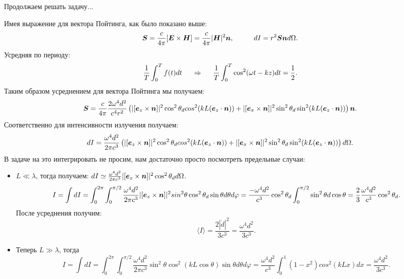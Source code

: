 Продолжаем решать задачу...

Имея выражение для вектора Пойтинга, как было показано выше:
\begin{equation*}
	\mbox{\boldmath $S$} = \frac{c}{4 \pi} [\mbox{\boldmath $E$} \times \mbox{\boldmath $H$}] = \frac{c}{4 \pi} |\mbox{\boldmath $H$}|^2 \mbox{\boldmath $n$},
	\hspace{1 cm}
	d I = r^2 \mbox{\boldmath $S$} \mbox{\boldmath $n$} d \Omega.
\end{equation*}
Усредняя по периоду: 
\begin{equation*}
	\frac{1}{T} \int_0^T f(t) d t
	\hspace{0.5 cm}
	 \Rightarrow
	 \hspace{0.5 cm}
	\frac{1}{T} \int_0^T \cos^2 (\omega t - kz) d t = \frac{1}{2}. 
\end{equation*}
Таким образом усреднением для вектора Пойтинга мы получаем:
\begin{equation*}
	\mbox{\boldmath $S$} = \frac{c}{4 \pi} \frac{2 \omega^4 d^2}{c^4 r^2} \left(
	|[\mbox{\boldmath $e$}_z \times \mbox{\boldmath $n$}]|^2 \cos^2 \theta_d cos^2 (k L (\mbox{\boldmath $e$}_z \cdot \mbox{\boldmath $n$}))
	+
	|[\mbox{\boldmath $e$}_x \times \mbox{\boldmath $n$}]|^2 \sin^2 \theta_d \sin^2 (k L (\mbox{\boldmath $e$}_z \cdot \mbox{\boldmath $n$}))
	\right) \mbox{\boldmath $n$}.
\end{equation*}
Соответственно для интенсивности излучения получаем:
\begin{equation*}
	d I = \frac{\omega^4 d^2}{2\pi c^3} \left(
	|[\mbox{\boldmath $e$}_z \times \mbox{\boldmath $n$}]|^2 \cos^2 \theta_d cos^2 (k L (\mbox{\boldmath $e$}_z \cdot \mbox{\boldmath $n$}))
	+
	|[\mbox{\boldmath $e$}_x \times \mbox{\boldmath $n$}]|^2 \sin^2 \theta_d \sin^2 (k L (\mbox{\boldmath $e$}_z \cdot \mbox{\boldmath $n$}))
	\right) d \Omega.
\end{equation*}
В задаче на это интегрировать не просим, нам достаточно просто посмотреть предельные случаи:
\begin{itemize}
	\item $L \ll \lambda$, тогда получаем: $d I \simeq \frac{\omega^4 d^2}{2 \pi c^3} |[\mbox{\boldmath $e$}_z \times \mbox{\boldmath $n$}]|^2 \cos^2 \theta_d d \Omega$.
	\begin{equation*}
		I = \int d I = \int_0^{2\pi} \int_{0}^{\pi/2}
		\frac{\omega^4 d^2}{2 \pi c^3} |[\mbox{\boldmath $e$}_z \times \mbox{\boldmath $n$}]|^2  sin^2 \theta \cos^2 \theta_d \sin \theta d \theta d\varphi 
		= 
		\frac{- \omega^4 d^2}{c^3} \cos^2 \theta_d \int_{0}^{\pi/2} \sin^2 \theta d\cos \theta =  \frac{2}{3}\frac{\omega^4 d^2}{c^3} \cos^2 \theta_d.
	\end{equation*}
	После усреднения получим: \begin{equation*}
		\langle I \rangle = \frac{2 |\ddot{d}|^2}{3 c^3} = \frac{\omega^4 d^2}{3 c^3}.
	\end{equation*}
	\item Теперь $L \gg \lambda$, тогда
	\begin{equation*}
		I = \int d I = \int_0^{2 \pi} \int_0^{\pi/2}
		\frac{\omega^4 d^2}{2 \pi c^3} \sin^2 \theta \cos^2 (k L \cos \theta) \sin \theta d \theta d \varphi
		= \frac{\omega^4 d^2}{c^3} \int_0^1 (1- x^2)cos^2(k L x) d x = \frac{\omega^4 d^2}{3 c^3}.
	\end{equation*}
\end{itemize}

